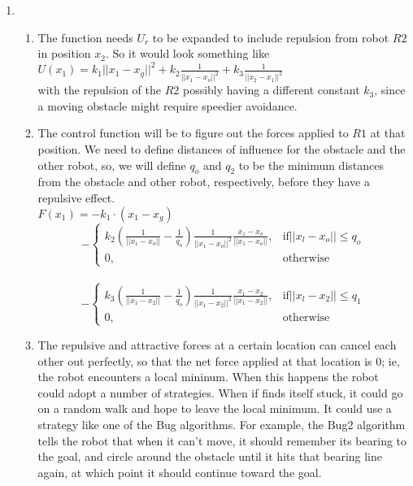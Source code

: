 \documentclass[letter,8pt]{article}
\begin{document}
\begin{enumerate}
\item
  \begin{enumerate}[label=\alph*)]
    \item The function needs $U_r$ to be expanded to include repulsion from robot $R2$ in position $x_2$. So it would look something like\\
      $U(x_1) = k_1||x_1 - x_g||^2 + k_2\frac{1}{||x_1 - x_o||^2} + k_3\frac{1}{||x_2 - x_1||^2}$\\
      with the repulsion of the $R2$ possibly having a different constant $k_3$, since a moving obstacle might require speedier avoidance.

    \item The control function will be to figure out the forces applied to $R1$ at that position. 
      We need to define distances of influence for the obstacle and the other robot, so, we will define $q_o$ and $q_2$
      to be the minimum distances from the obstacle and other robot, respectively, before they have a repulsive effect.\\
      $F(x_1) = -k_1 \cdot ( x_1 - x_g)$
\\
      \[
      -\begin{cases}
        k_2(\frac{1}{||x_1 - x_o||} - \frac{1}{q_o})\frac{1}{||x_1 - x_o||^2}\frac{x_1 - x_o}{||x_1 - x_o||}, & \text{if} ||x_l - x_o|| \leq q_o \\
        0, & \text{otherwise}
      \end{cases}
      \]
\\
      \[
      -\begin{cases}
        k_3(\frac{1}{||x_1 - x_2||} - \frac{1}{q_o})\frac{1}{||x_1 - x_2||^2}\frac{x_1 - x_2}{||x_1 - x_2||}, & \text{if} ||x_l - x_2|| \leq q_1 \\
        0, & \text{otherwise}
       \end{cases}
      \]
    \item The repulsive and attractive forces at a certain location can cancel each other out perfectly, so that 
      the net force applied at that location is $0$; ie, the robot encounters a local mininum.
      When this happens the robot could adopt a number of strategies. When if finds itself stuck, it could go on a 
      random walk and hope to leave the local minimum. It could use a strategy like one of the Bug algorithms. 
      For example, the Bug2 algorithm tells the robot that when it can't move, it should remember its bearing
      to the goal, and circle around the obstacle until it hits that bearing line again, at which point it should
      continue toward the goal.
  \end{enumerate}
  

\end{enumerate}
\end{document}
